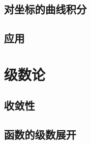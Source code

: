 \documentclass[UTF8]{../../09-Mathematics}
\begin{document}
\section{对坐标的曲线积分}


\section{应用}




\chapter{级数论}

\section{收敛性}
\section{函数的级数展开}
\end{document}

